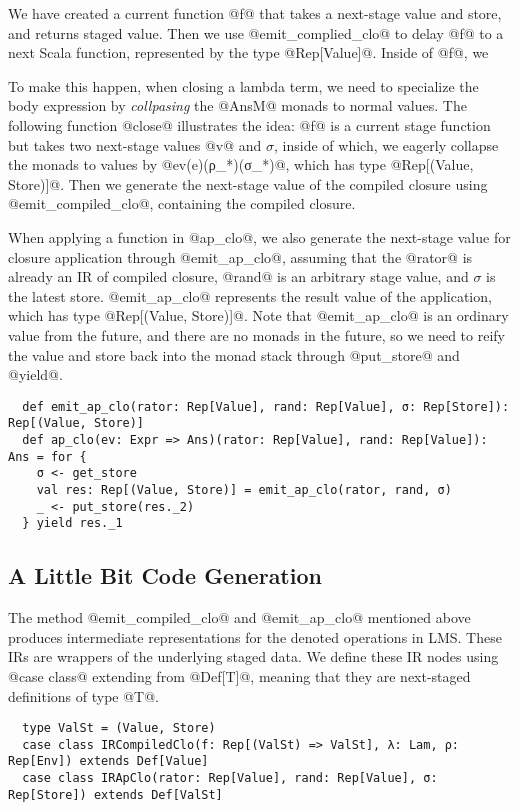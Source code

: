 We have created a current function @f@ that takes a next-stage value
and store, and returns staged value. Then we use @emit_complied_clo@
to delay @f@ to a next Scala function, represented by the type
@Rep[Value]@. Inside of @f@, we

To make this happen, when
closing a lambda term, we need to specialize the body expression by
\textit{collpasing} the @AnsM@ monads to normal values. The
following function @close@ illustrates the idea: @f@ is a current stage function
but takes two next-stage values @v@ and $\sigma$, inside of which, we eagerly
collapse the monads to values by @ev(e)(ρ_*)(σ_*)@, which has type
@Rep[(Value, Store)]@. Then we generate the next-stage value of the compiled
closure using @emit_compiled_clo@, containing the compiled closure.


When applying a function in @ap_clo@, we also generate the next-stage value
for closure application through @emit_ap_clo@, assuming that the @rator@ is already an
IR of compiled closure, @rand@ is an arbitrary stage value, and $\sigma$ is the
latest store. @emit_ap_clo@ represents the result value of the application, which has type
@Rep[(Value, Store)]@. Note that @emit_ap_clo@ is an ordinary value from the
future, and there are no monads in the future, so we need to reify the value and
store back into the monad stack through @put_store@ and @yield@.

\begin{lstlisting}
  def emit_ap_clo(rator: Rep[Value], rand: Rep[Value], σ: Rep[Store]): Rep[(Value, Store)]
  def ap_clo(ev: Expr => Ans)(rator: Rep[Value], rand: Rep[Value]): Ans = for {
    σ <- get_store
    val res: Rep[(Value, Store)] = emit_ap_clo(rator, rand, σ)
    _ <- put_store(res._2)
  } yield res._1
\end{lstlisting}

\subsection{A Little Bit Code Generation}

The method @emit_compiled_clo@ and @emit_ap_clo@ mentioned above produces
intermediate representations for the denoted operations in LMS. These IRs are
wrappers of the underlying staged data. We define these IR nodes using
@case class@ extending from @Def[T]@, meaning that they are next-staged definitions of type @T@.

\begin{lstlisting}
  type ValSt = (Value, Store)
  case class IRCompiledClo(f: Rep[(ValSt) => ValSt], λ: Lam, ρ: Rep[Env]) extends Def[Value]
  case class IRApClo(rator: Rep[Value], rand: Rep[Value], σ: Rep[Store]) extends Def[ValSt]
\end{lstlisting}

